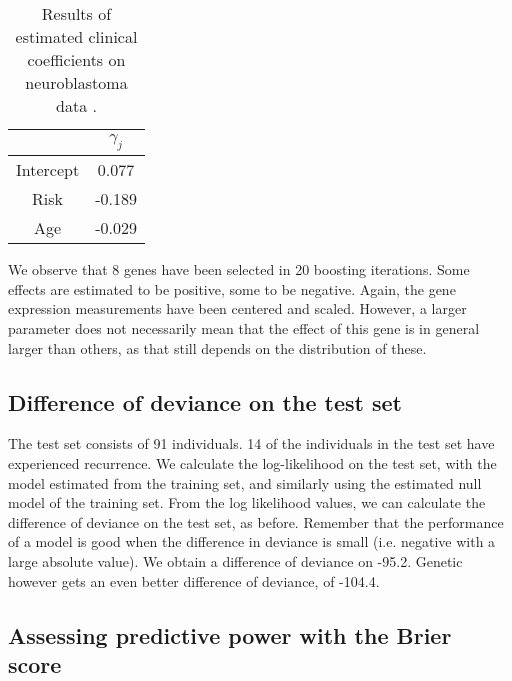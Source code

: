 \begin{table}
\caption{Results of estimated clinical coefficients on neuroblastoma data \citep{oberthuer-data}.}
\label{tab:oberthuer-gamma}
\centering
\begin{tabular}{cc}
\toprule
          & $\gamma_j$\\
\hline
Intercept &   0.077   \\
Risk      &  -0.189   \\
Age       &  -0.029   \\
\bottomrule
\end{tabular}
\end{table}

We observe that 8 genes have been selected in 20 boosting iterations.
Some effects are estimated to be positive, some to be negative.
Again, the gene expression measurements have been centered and scaled.
However, a larger parameter does not necessarily mean that the effect of this gene is in general larger than others, as that still depends on the distribution of these.



\subsection{Difference of deviance on the test set}
The test set consists of 91 individuals.
14 of the individuals in the test set have experienced recurrence.
We calculate the log-likelihood on the test set, with the model estimated from the training set, and similarly using the estimated null model of the training set.
From the log likelihood values, we can calculate the difference of deviance on the test set, as before.
Remember that the performance of a model is good when the difference in deviance is small (i.e. negative with a large absolute value).
We obtain a difference of deviance on -95.2.
Genetic however gets an even better difference of deviance, of -104.4.

\subsection{Assessing predictive power with the Brier score}

